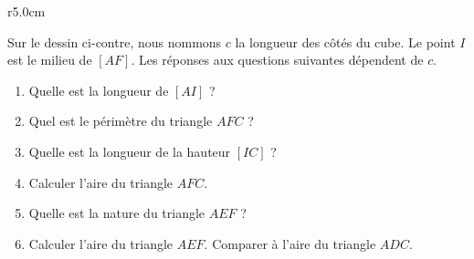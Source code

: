 
\begin{exercice}\label{exosmath-0115}

\begin{wrapfigure}{r}{5.0cm}
   \vspace{-0.5cm}        %
   \centering
   
\end{wrapfigure}

    Sur le dessin ci-contre, nous nommons \( c\) la longueur des côtés du cube. Le point \( I\) est le milieu de \( [AF]\). Les réponses aux questions suivantes dépendent de \( c\).

        \begin{enumerate}
            \item
                Quelle est la longueur de \( [AI]\) ?
            \item
                Quel est le périmètre du triangle \( AFC\) ?
            \item
                Quelle est la longueur de la hauteur \( [IC]\) ?
            \item
                Calculer l'aire du triangle \( AFC\).
            \item
                Quelle est la nature du triangle \( AEF\) ?
            \item
                Calculer l'aire du triangle \( AEF\). Comparer à l'aire du triangle \( ADC\).
        \end{enumerate}

\end{exercice}
